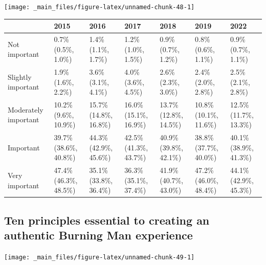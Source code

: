 \documentclass[
]{book}
\begin{document}
\texttt{[image: \_main\_files/figure-latex/unnamed-chunk-48-1]}

\begin{table}
\centering
\begin{tabular}[t]{>{}l|>{}l|>{}l|>{}l|>{}l|>{}l|>{}l}
\hline
  & 2015 & 2016 & 2017 & 2018 & 2019 & 2022\\
\hline
Not important & 0.7\% (0.5\%, 1.0\%) & 1.4\% (1.1\%, 1.7\%) & 1.2\% (1.0\%, 1.5\%) & 0.9\% (0.7\%, 1.2\%) & 0.8\% (0.6\%, 1.1\%) & 0.9\% (0.7\%, 1.1\%)\\
\hline
Slightly important & 1.9\% (1.6\%, 2.2\%) & 3.6\% (3.1\%, 4.1\%) & 4.0\% (3.6\%, 4.5\%) & 2.6\% (2.3\%, 3.0\%) & 2.4\% (2.0\%, 2.8\%) & 2.5\% (2.1\%, 2.8\%)\\
\hline
Moderately important & 10.2\% (9.6\%, 10.9\%) & 15.7\% (14.8\%, 16.8\%) & 16.0\% (15.1\%, 16.9\%) & 13.7\% (12.8\%, 14.5\%) & 10.8\% (10.1\%, 11.6\%) & 12.5\% (11.7\%, 13.3\%)\\
\hline
Important & 39.7\% (38.6\%, 40.8\%) & 44.3\% (42.9\%, 45.6\%) & 42.5\% (41.3\%, 43.7\%) & 40.9\% (39.8\%, 42.1\%) & 38.8\% (37.7\%, 40.0\%) & 40.1\% (38.9\%, 41.3\%)\\
\hline
Very important & 47.4\% (46.3\%, 48.5\%) & 35.1\% (33.8\%, 36.4\%) & 36.3\% (35.1\%, 37.4\%) & 41.9\% (40.7\%, 43.0\%) & 47.2\% (46.0\%, 48.4\%) & 44.1\% (42.9\%, 45.3\%)\\
\hline
\end{tabular}
\end{table}

\hypertarget{ten-principles-essential-to-creating-an-authentic-burning-man-experience}{%
\subsection{Ten principles essential to creating an authentic Burning Man experience}\label{ten-principles-essential-to-creating-an-authentic-burning-man-experience}}

\texttt{[image: \_main\_files/figure-latex/unnamed-chunk-49-1]}
\end{document}
